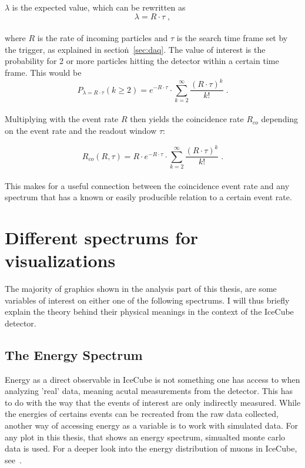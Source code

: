 $\lambda$ is the expected value, which can be rewritten as \\

\begin{equation}
    \lambda = R \cdot \tau \; ,
\end{equation}\\

where $R$ is the rate of incoming particles and $\tau$ is the search time frame set by the trigger, as explained in section\.~\ref{sec:daq}. 
The value of interest is the probability for 2 or more particles hitting the detector within a certain time frame. This would be \\

\begin{equation}
    P_{\lambda = R\cdot\tau}(k\geq2) = e^{- R\cdot\tau} \cdot \sum_{k=2}^\infty \frac{{(R\cdot\tau)}^k}{k!} \; .
\end{equation}\\ 

Multiplying with the event rate $R$ then yields the coincidence rate $R_{co}$ depending on the event rate and the readout window $\tau$:

\begin{equation}
    R_{co}(R,\tau) = R \cdot e^{- R\cdot\tau} \cdot \sum_{k=2}^\infty \frac{{(R\cdot\tau)}^k}{k!}\;.
    \label{eq:multi_rate}
\end{equation}\\

This makes for a useful connection between the coincidence event rate and any spectrum that has a known or easily producible relation to a certain event rate.

\section{Different spectrums for visualizations}\label{sec:spec}
The majority of graphics shown in the analysis part of this thesis, are some variables of interest on either one of the following spectrums. I will thus briefly 
explain the theory behind their physical meanings in the context of the IceCube detector. 

\subsection{The Energy Spectrum}
Energy as a direct observable in IceCube is not something one has access to when analyzing 'real' data, meaning acutal measurements from the detector. 
This has to do with the way that the events of interest are only indirectly measured. While the energies of certains events can be recreated from the raw data
collected, another way of accessing energy as a variable is to work with simulated data. 
For any plot in this thesis, that shows an energy spectrum, simualted monte carlo data is used. 
For a deeper look into the energy distribution of muons in IceCube, see~\cite{einstein}. 

